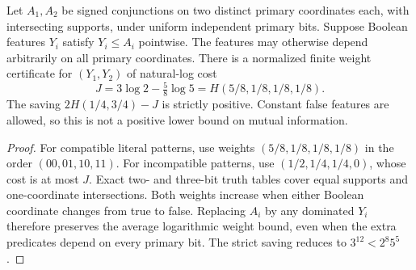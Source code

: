 \begin{theorem}
  \label{thm:lowerbounds-algebraic-geometry-actual-pair-entropy}
  \leanok
  Let $A_1,A_2$ be signed conjunctions on two distinct primary coordinates
  each, with intersecting supports, under uniform independent primary bits.
  Suppose Boolean features $Y_i$ satisfy $Y_i\le A_i$ pointwise. The features
  may otherwise depend arbitrarily on all primary coordinates. There is a
  normalized finite weight certificate for $(Y_1,Y_2)$ of natural-log cost
  \[
    J=3\log 2-\tfrac58\log 5
      =H(5/8,1/8,1/8,1/8).
  \]
  The saving $2H(1/4,3/4)-J$ is strictly positive. Constant false features
  are allowed, so this is not a positive lower bound on mutual information.
\end{theorem}
\begin{proof}
  \leanok
  For compatible literal patterns, use weights $(5/8,1/8,1/8,1/8)$ in
  the order $(00,01,10,11)$. For incompatible patterns, use
  $(1/2,1/4,1/4,0)$, whose cost is at most $J$. Exact two- and three-bit
  truth tables cover equal supports and one-coordinate intersections.
  Both weights increase when either Boolean coordinate changes from true
  to false. Replacing $A_i$ by any dominated $Y_i$ therefore preserves the
  average logarithmic weight bound, even when the extra predicates depend
  on every primary bit. The strict saving reduces to $3^{12}<2^8 5^5$.
\end{proof}

